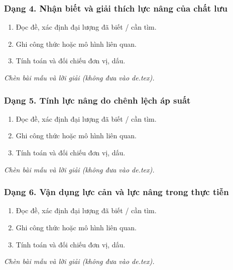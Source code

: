 \subsubsection{Dạng 4. Nhận biết và giải thích lực nâng của chất lưu}
\begin{phuongphap}
\begin{enumerate}
\item Đọc đề, xác định đại lượng đã biết / cần tìm.
\item Ghi công thức hoặc mô hình liên quan.
\item Tính toán và đối chiếu đơn vị, dấu.
\end{enumerate}
\end{phuongphap}
\begin{vidumau}
\textit{Chèn bài mẫu và lời giải (không đưa vào de.tex).}
\end{vidumau}

\subsubsection{Dạng 5. Tính lực nâng do chênh lệch áp suất}
\begin{phuongphap}
\begin{enumerate}
\item Đọc đề, xác định đại lượng đã biết / cần tìm.
\item Ghi công thức hoặc mô hình liên quan.
\item Tính toán và đối chiếu đơn vị, dấu.
\end{enumerate}
\end{phuongphap}
\begin{vidumau}
\textit{Chèn bài mẫu và lời giải (không đưa vào de.tex).}
\end{vidumau}

\subsubsection{Dạng 6. Vận dụng lực cản và lực nâng trong thực tiễn}
\begin{phuongphap}
\begin{enumerate}
\item Đọc đề, xác định đại lượng đã biết / cần tìm.
\item Ghi công thức hoặc mô hình liên quan.
\item Tính toán và đối chiếu đơn vị, dấu.
\end{enumerate}
\end{phuongphap}
\begin{vidumau}
\textit{Chèn bài mẫu và lời giải (không đưa vào de.tex).}
\end{vidumau}

